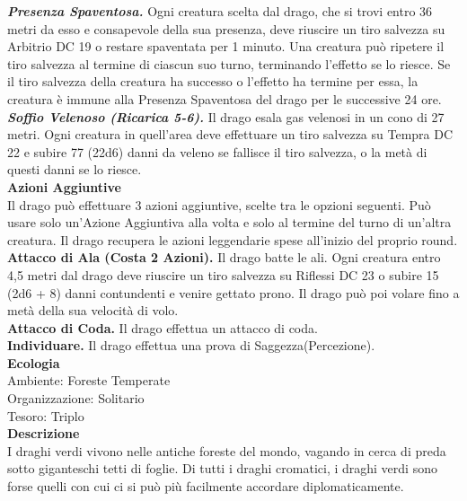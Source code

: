 \begin{multicols}{2}
\emph{\textbf{Presenza Spaventosa.}} Ogni creatura scelta dal drago, che si trovi entro 36 metri da esso e consapevole della sua presenza, deve riuscire un tiro salvezza su Arbitrio DC 19 o restare spaventata per 1 minuto. Una creatura può ripetere il tiro salvezza al termine di ciascun suo turno, terminando l'effetto se lo riesce. Se il tiro salvezza della creatura ha successo o l'effetto ha termine per essa, la creatura è immune alla Presenza Spaventosa del drago per le successive 24 ore.\\
\emph{\textbf{Soffio Velenoso (Ricarica 5-6).}} Il drago esala gas velenosi in un cono di 27 metri. Ogni creatura in quell'area deve effettuare un tiro salvezza su Tempra DC 22 e subire 77 (22d6) danni da veleno se fallisce il tiro salvezza, o la metà di questi danni se lo riesce.\\
\textbf{Azioni Aggiuntive}\\
Il drago può effettuare 3 azioni aggiuntive, scelte tra le opzioni seguenti. Può usare solo un'Azione Aggiuntiva alla volta e solo al termine del turno di un'altra creatura. Il drago recupera le azioni leggendarie spese all'inizio del proprio round.\\
\textbf{Attacco di Ala (Costa 2 Azioni).} Il drago batte le ali. Ogni creatura entro 4,5 metri dal  drago deve riuscire un tiro salvezza su Riflessi DC 23 o subire 15 (2d6 + 8) danni contundenti e venire gettato prono. Il drago può poi volare fino a metà della sua velocità di volo. \\
\textbf{Attacco di Coda.} Il drago effettua un attacco di coda.\\
\textbf{Individuare.} Il drago effettua una prova di Saggezza(Percezione).\\
\textbf{Ecologia}\\
Ambiente: Foreste Temperate\\
Organizzazione: Solitario\\
Tesoro: Triplo\\
\textbf{Descrizione}\\
I draghi verdi vivono nelle antiche foreste del mondo, vagando in cerca di preda sotto giganteschi tetti di foglie. Di tutti i draghi cromatici, i draghi verdi sono forse quelli con cui ci si può più facilmente accordare diplomaticamente.\\


\end{multicols}
